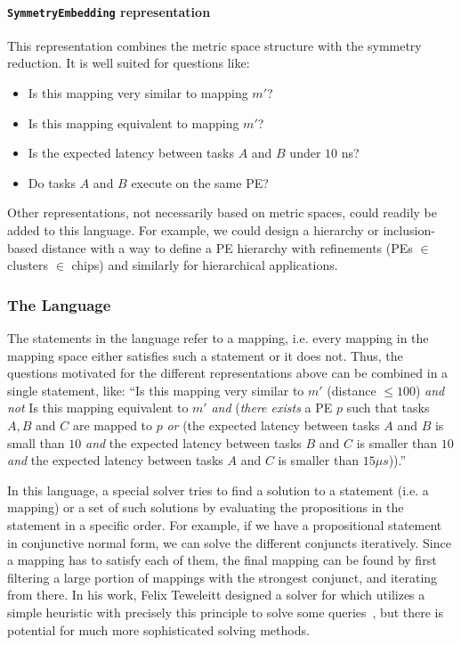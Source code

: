 \paragraph{\texttt{SymmetryEmbedding} representation}
This representation combines the metric space structure with the symmetry reduction. 
It is well suited for questions like:
\begin{itemize}
\item Is this mapping very similar to mapping $m'$? 
\item Is this mapping equivalent to mapping $m'$?
\item Is the expected latency between tasks $A$ and $B$ under $10$ ns?
\item Do tasks $A$ and $B$ execute on the same \ac{PE}?
\end{itemize}

Other representations, not necessarily based on metric spaces, could readily be added to this language. 
For example, we could design a hierarchy or inclusion-based distance with a way to define a \ac{PE} hierarchy with refinements (PEs $\in$ clusters $\in$ chips) and similarly for hierarchical applications.

\subsubsection{The Language}

The statements in the language refer to a mapping, i.e. every mapping in the mapping space either satisfies such a statement or it does not.
Thus, the questions motivated for the different representations above can be combined in a single statement, like:
``Is this mapping very similar to $m'$ (distance $\leq 100$) \emph{and} \emph{not} Is this mapping equivalent to $m'$ \emph{and} (\emph{there exists} a PE $p$ such that tasks $A, B$ and $C$ are mapped to $p$ \emph{or} (the expected latency between tasks $A$ and $B$ is small than $10$ \emph{and} the expected latency between tasks $B$ and $C$ is smaller than $10$ \emph{and} the expected latency between tasks $A$ and $C$ is smaller than $15 \mu s$)).''

In this language, a special solver tries to find a solution to a statement (i.e. a mapping) or a set of such solutions by evaluating the propositions in the statement in a specific order.
For example, if we have a propositional statement in conjunctive normal form, we can solve the different conjuncts iteratively.
Since a mapping has to satisfy each of them, the final mapping can be found by first filtering a large portion of mappings with the strongest conjunct, and iterating from there.
In his work, Felix Teweleitt designed a solver for \mocasin which utilizes a simple heuristic with precisely this principle to solve some queries~\cite{teweleitt_studienarbeit}, but there is potential for much more sophisticated solving methods.

